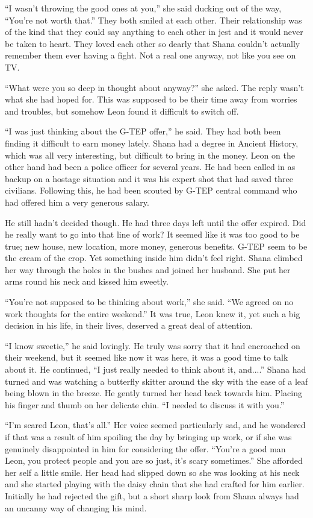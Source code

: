 ``I wasn't throwing the good ones at you,'' she said ducking out of the way, ``You're not worth that.''  They both smiled at each other.  Their relationship was of the kind that they could say anything to each other in jest and it would never be taken to heart.  They loved each other so dearly that Shana couldn't actually remember them ever having a fight.  Not a real one anyway, not like you see on TV.  

``What were you so deep in thought about anyway?'' she asked.  The reply wasn't what she had hoped for.  This was supposed to be their time away from worries and troubles, but somehow Leon found it difficult to switch off.  

``I was just thinking about the G-TEP offer,''  he said.  They had both been finding it difficult to earn money lately.  Shana had a degree in Ancient History, which was all very interesting, but difficult to bring in the money.  Leon on the other hand had been a police officer for several years.  He had been called in as backup on a hostage situation and it was his expert shot that had saved three civilians.  Following this, he had been scouted by G-TEP central command who had offered him a very generous salary.

He still hadn't decided though.  He had three days left until the offer expired.  Did he really want to go into that line of work?  It seemed like it was too good to be true; new house, new location, more money, generous benefits.  G-TEP seem to be the cream of the crop.  Yet something inside him didn't feel right.  Shana climbed her way through the holes in the bushes and joined her husband.  She put her arms round his neck and kissed him sweetly.  

``You're not supposed to be thinking about work,'' she said.  ``We agreed on no work thoughts for the entire weekend.''  It was true, Leon knew it, yet such a big decision in his life, in their lives, deserved a great deal of attention.

``I know sweetie,'' he said lovingly.  He truly was sorry that it had encroached on their weekend, but it seemed like now it was here, it was a good time to talk about it.  He continued, ``I just really needed to think about it, and....'' Shana had turned and was watching a butterfly skitter around the sky with the ease of a leaf being blown in the breeze.  He gently turned her head back towards him.  Placing his finger and thumb on her delicate chin.  ``I needed to discuss it with you.''

``I'm scared Leon, that's all.''  Her voice seemed particularly sad, and he wondered if that was a result of him spoiling the day by bringing up work, or if she was genuinely disappointed in him for considering the offer.  ``You're a good man Leon, you protect people and you are so just, it's scary sometimes.''  She afforded her self a little smile.  Her head had slipped down so she was looking at his neck and she started playing with the daisy chain that she had crafted for him earlier.  Initially he had rejected the gift, but a short sharp look from Shana always had an uncanny way of changing his mind.

